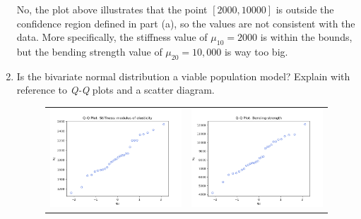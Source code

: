 \begin{enumerate}[label= (\alph*)]
    No, the plot above illustrates that the point $[2000, 10000]$ is outside the confidence region defined in part (a), so the values are not consistent with the data. More specifically, the stiffness value of $\mu_{10} = 2000$ is within the bounds, but the bending strength value of $\mu_{20} = 10,000$ is way too big.

    \item Is the bivariate normal distribution a viable population model? Explain with reference to \textit{Q-Q} plots and a scatter diagram.
    
    \begin{figure}[H]
        \centering
        \begin{tabular}{cc}
            \includegraphics[scale=0.30]{./python/chapter-5/Question-5-19-c-QQ-Stiffness.png} &
            \includegraphics[scale=0.30]{./python/chapter-5/Question-5-19-c-QQ-Bending.png}
        \end{tabular}
    \end{figure}


\end{enumerate}
